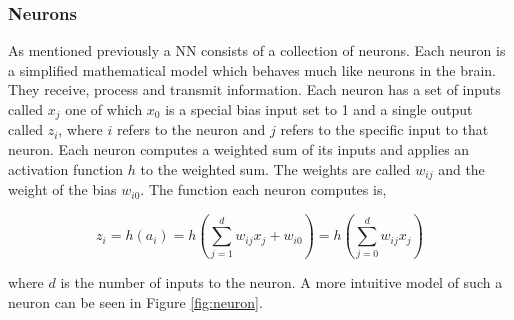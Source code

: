 \subsubsection{Neurons}\label{sec:neurons}

As mentioned previously a \gls{NN} consists of a collection of neurons. Each
neuron is a simplified mathematical model which behaves much like neurons in
the brain. They receive, process and transmit information. Each neuron has a
set of inputs called $x_{j}$ one of which $x_{0}$ is a special bias input set
to 1 and a single output called $z_i$, where $i$ refers to the neuron and $j$
refers to the specific input to that neuron. Each neuron computes a weighted sum
of its inputs and applies an activation function $h$ to the weighted sum. The
weights are called $w_{ij}$ and the weight of the bias $w_{i0}$. The function
each neuron computes is,

\begin{equation}\label{eq:neuron}
    z_i = h(a_i) = h\left(
        \sum_{j = 1}^d w_{ij}x_j + w_{i0}
 \right) = h\left(
        \sum_{j = 0}^d w_{ij}x_j \right)
\end{equation}

where $d$ is the number of inputs to the neuron. A more intuitive model of such
a neuron can be seen in Figure \ref{fig:neuron}.

